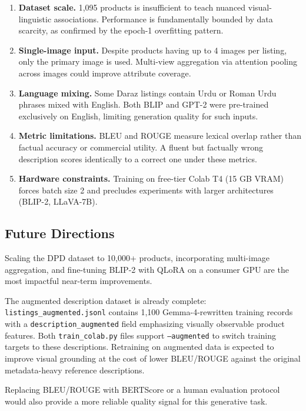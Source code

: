 \documentclass[12pt,a4paper]{article}
\begin{document}
\begin{enumerate}[noitemsep]
  \item \textbf{Dataset scale.} 1,095 products is insufficient to teach nuanced
        visual-linguistic associations. Performance is fundamentally bounded by
        data scarcity, as confirmed by the epoch-1 overfitting pattern.
  \item \textbf{Single-image input.} Despite products having up to 4 images per listing,
        only the primary image is used. Multi-view aggregation via attention pooling
        across images could improve attribute coverage.
  \item \textbf{Language mixing.} Some Daraz listings contain Urdu or Roman Urdu
        phrases mixed with English. Both BLIP and GPT-2 were pre-trained exclusively
        on English, limiting generation quality for such inputs.
  \item \textbf{Metric limitations.} BLEU and ROUGE measure lexical overlap rather
        than factual accuracy or commercial utility. A fluent but factually wrong
        description scores identically to a correct one under these metrics.
  \item \textbf{Hardware constraints.} Training on free-tier Colab T4 (15 GB VRAM)
        forces batch size 2 and precludes experiments with larger architectures
        (BLIP-2, LLaVA-7B).
\end{enumerate}

\subsection{Future Directions}

Scaling the DPD dataset to 10,000+ products, incorporating multi-image aggregation,
and fine-tuning BLIP-2 with QLoRA on a consumer GPU are the most impactful near-term
improvements.

The augmented description dataset is already complete:
\texttt{listings\_augmented.jsonl} contains 1,100 Gemma-4-rewritten training records
with a \texttt{description\_augmented} field emphasizing visually observable product
features. Both \texttt{train\_colab.py} files support \texttt{--augmented} to switch
training targets to these descriptions. Retraining on augmented data is expected to
improve visual grounding at the cost of lower BLEU/ROUGE against the original
metadata-heavy reference descriptions.

Replacing BLEU/ROUGE with BERTScore or a human evaluation protocol would also
provide a more reliable quality signal for this generative task.
\end{document}

